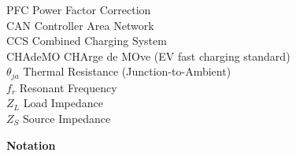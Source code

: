 \documentclass[12pt,a4paper]{report}
\begin{document}
\begin{tabbing}
\hspace{1.5cm}PFC \> Power Factor Correction\\
\hspace{1.5cm}CAN \> Controller Area Network\\
\hspace{1.5cm}CCS \> Combined Charging System\\
\hspace{1.5cm}CHAdeMO \> CHArge de MOve (EV fast charging standard)\\
\hspace{1.5cm}$\theta_{ja}$ \> Thermal Resistance (Junction-to-Ambient)\\
\hspace{1.5cm}$f_r$ \> Resonant Frequency\\
\hspace{1.5cm}$Z_L$ \> Load Impedance\\
\hspace{1.5cm}$Z_S$ \> Source Impedance\\

\end{tabbing}











\newpage

\begin{center}

 \huge \textbf{Notation}

\end{center}


 
\end{document}
